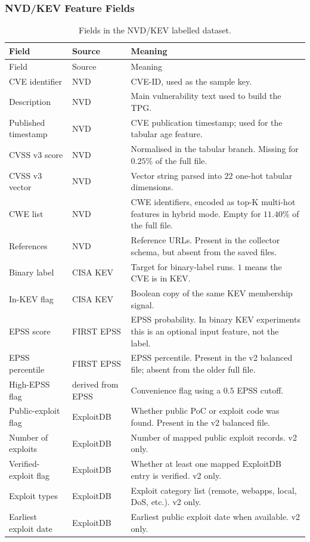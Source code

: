 \documentclass[11pt]{article}
\begin{document}
\subsubsection{NVD/KEV Feature Fields}

\small
\begin{longtable}{p{}p{}p{}}
\caption{Fields in the NVD/KEV labelled dataset.}\\
\toprule
Field & Source & Meaning \\
\midrule
\endfirsthead
\toprule
Field & Source & Meaning \\
\midrule
\endhead
\bottomrule
\endfoot

CVE identifier & NVD & CVE-ID, used as the sample key. \\
Description & NVD & Main vulnerability text used to build the TPG. \\
Published timestamp & NVD & CVE publication timestamp; used for the tabular age feature. \\
CVSS v3 score & NVD & Normalised in the tabular branch. Missing for $0.25\%$ of the full file. \\
CVSS v3 vector & NVD & Vector string parsed into $22$ one-hot tabular dimensions. \\
CWE list & NVD & CWE identifiers, encoded as top-K multi-hot features in hybrid mode. Empty for $11.40\%$ of the full file. \\
References & NVD & Reference URLs. Present in the collector schema, but absent from the saved files. \\
Binary label & CISA KEV & Target for binary-label runs. $1$ means the CVE is in KEV. \\
In-KEV flag & CISA KEV & Boolean copy of the same KEV membership signal. \\
EPSS score & FIRST EPSS & EPSS probability. In binary KEV experiments this is an optional input feature, not the label. \\
EPSS percentile & FIRST EPSS & EPSS percentile. Present in the v2 balanced file; absent from the older full file. \\
High-EPSS flag & derived from EPSS & Convenience flag using a $0.5$ EPSS cutoff. \\
Public-exploit flag & ExploitDB & Whether public PoC or exploit code was found. Present in the v2 balanced file. \\
Number of exploits & ExploitDB & Number of mapped public exploit records. v2 only. \\
Verified-exploit flag & ExploitDB & Whether at least one mapped ExploitDB entry is verified. v2 only. \\
Exploit types & ExploitDB & Exploit category list (remote, webapps, local, DoS, etc.). v2 only. \\
Earliest exploit date & ExploitDB & Earliest public exploit date when available. v2 only. \\

\end{longtable}
\normalsize
\end{document}
